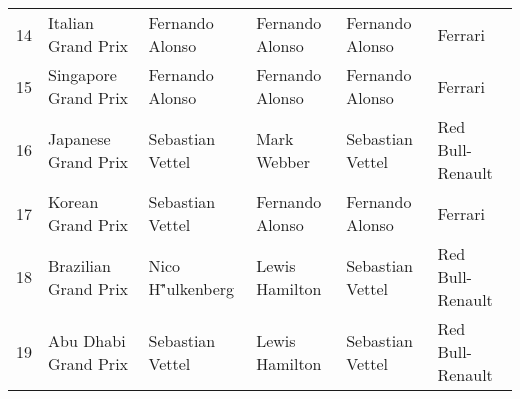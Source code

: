 \documentclass[12pt]{article}
\begin{document}
\begin{longtable}{rlllll}
14 & Italian Grand Prix & Fernando Alonso & Fernando Alonso & Fernando Alonso & Ferrari \\
15 & Singapore Grand Prix & Fernando Alonso & Fernando Alonso & Fernando Alonso & Ferrari \\
16 & Japanese Grand Prix & Sebastian Vettel & Mark Webber & Sebastian Vettel & Red Bull-Renault \\
17 & Korean Grand Prix & Sebastian Vettel & Fernando Alonso & Fernando Alonso & Ferrari \\
18 & Brazilian Grand Prix & Nico H\""ulkenberg & Lewis Hamilton & Sebastian Vettel & Red Bull-Renault \\
19 & Abu Dhabi Grand Prix & Sebastian Vettel & Lewis Hamilton & Sebastian Vettel & Red Bull-Renault \\
\end{longtable}
\end{document}
